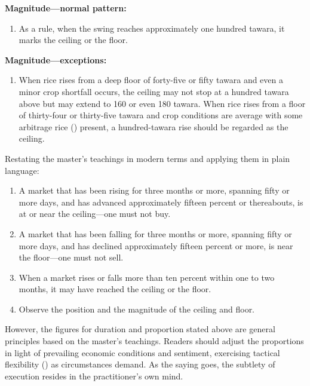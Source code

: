\textbf{Magnitude---normal pattern:}

\begin{enumerate}[nosep]
\item As a rule, when the swing reaches approximately one hundred
  tawara, it marks the ceiling or the floor.
\end{enumerate}

\textbf{Magnitude---exceptions:}

\begin{enumerate}[nosep]
\item When rice rises from a deep floor of forty-five or fifty
  tawara and even a minor crop shortfall occurs, the ceiling may
  not stop at a hundred tawara above but may extend to 160 or
  even 180 tawara. When rice rises from a floor of thirty-four or
  thirty-five tawara and crop conditions are average with some
  arbitrage rice () present, a hundred-tawara
  rise should be regarded as the ceiling.
\end{enumerate}

Restating the master's teachings in modern terms and applying them
in plain language:

\begin{enumerate}[nosep]
\item A market that has been rising for three months or more, spanning
  fifty or more days, and has advanced approximately fifteen
  percent or thereabouts, is at or near the ceiling---one must not
  buy.
\item A market that has been falling for three months or more,
  spanning fifty or more days, and has declined approximately
  fifteen percent or more, is near the floor---one must not sell.
\item When a market rises or falls more than ten percent within one
  to two months, it may have reached the ceiling or the floor.
\item Observe the position and the magnitude of the ceiling and floor.
\end{enumerate}

However, the figures for duration and proportion stated above are
general principles based on the master's teachings. Readers should
adjust the proportions in light of prevailing economic conditions
and sentiment, exercising tactical flexibility ()
as circumstances demand. As the saying goes, the subtlety of
execution resides in the practitioner's own mind.


